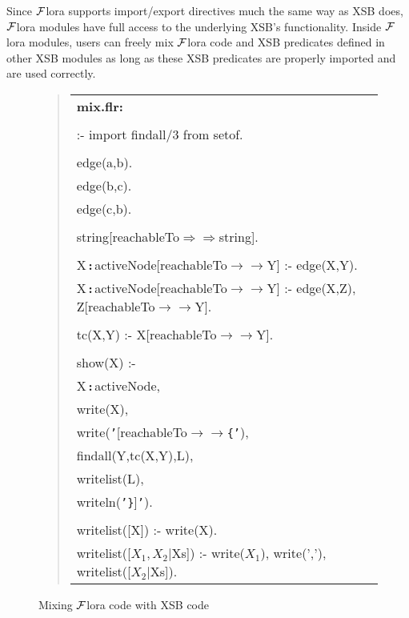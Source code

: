 \documentclass[11pt]{article}
\newcommand{\isa}{\,{\bf{:}}\,}
\newcommand{\mvd}{\ensuremath{{\rightarrow\!\!\!\!\rightarrow}}}  %
\newcommand{\Mvd}{\ensuremath{{\Rightarrow\!\!\!\!\Rightarrow}}}  %
\newcommand{\FLORA}{{\mbox{${\cal F}${\sc lora}}}\xspace}
\begin{document}
Since \FLORA supports import/export directives much the same way as XSB
does, \FLORA modules have full access to the underlying XSB's
functionality.  Inside \FLORA modules, users can freely mix \FLORA code and
XSB predicates defined in other XSB modules as long as these XSB predicates
are properly imported and are used correctly.
\begin{figure}[tb]
\begin{quote}
\begin{tabular}{l}
{\bf mix.flr:}\\ \\
:- import findall/3 from setof. \\
\\
edge(a,b). \\
edge(b,c). \\
edge(c,b). \\
\\
string[reachableTo{\Mvd}string]. \\
\\
X{\isa}activeNode[reachableTo{\mvd}Y] :- edge(X,Y). \\
X{\isa}activeNode[reachableTo{\mvd}Y] :- edge(X,Z), Z[reachableTo{\mvd}Y]. \\
\\
tc(X,Y) :- X[reachableTo{\mvd}Y]. \\
\\
show(X) :- \\
\hspace{1cm} X{\isa}activeNode, \\
\hspace{1cm} write(X), \\
\hspace{1cm} write({\tt'}[reachableTo{\mvd}{\tt \{'}), \\
\hspace{1cm} findall(Y,tc(X,Y),L), \\
\hspace{1cm} writelist(L), \\
\hspace{1cm} writeln({\tt '\}}]{\tt '}). \\
\\
writelist([X]) :- write(X). \\
writelist([$X_1,X_2|$Xs]) :- write($X_1$), write(','), writelist([$X_2|$Xs]).
\end{tabular}
\end{quote}
\caption{Mixing \FLORA code with XSB code} \label{fig:fig-mix}
\end{figure}
\end{document}
